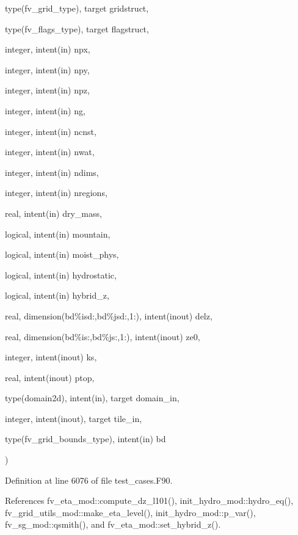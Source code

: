 {\begin{DoxyParamCaption}
\item[{type(fv\-\_\-grid\-\_\-type), target}]{gridstruct, }
\item[{type(fv\-\_\-flags\-\_\-type), target}]{flagstruct, }
\item[{integer, intent(in)}]{npx, }
\item[{integer, intent(in)}]{npy, }
\item[{integer, intent(in)}]{npz, }
\item[{integer, intent(in)}]{ng, }
\item[{integer, intent(in)}]{ncnst, }
\item[{integer, intent(in)}]{nwat, }
\item[{integer, intent(in)}]{ndims, }
\item[{integer, intent(in)}]{nregions, }
\item[{real, intent(in)}]{dry\-\_\-mass, }
\item[{logical, intent(in)}]{mountain, }
\item[{logical, intent(in)}]{moist\-\_\-phys, }
\item[{logical, intent(in)}]{hydrostatic, }
\item[{logical, intent(in)}]{hybrid\-\_\-z, }
\item[{real, dimension(bd\%isd\-:,bd\%jsd\-:,1\-:), intent(inout)}]{delz, }
\item[{real, dimension(bd\%is\-:,bd\%js\-:,1\-:), intent(inout)}]{ze0, }
\item[{integer, intent(inout)}]{ks, }
\item[{real, intent(inout)}]{ptop, }
\item[{type(domain2d), intent(in), target}]{domain\-\_\-in, }
\item[{integer, intent(inout), target}]{tile\-\_\-in, }
\item[{type(fv\-\_\-grid\-\_\-bounds\-\_\-type), intent(in)}]{bd}
\end{DoxyParamCaption}
)}\label{classtest__cases__mod_afe098f0f0a16a14e3e59312a69374b9e}


Definition at line 6076 of file test\-\_\-cases.\-F90.



References fv\-\_\-eta\-\_\-mod\-::compute\-\_\-dz\-\_\-l101(), init\-\_\-hydro\-\_\-mod\-::hydro\-\_\-eq(), fv\-\_\-grid\-\_\-utils\-\_\-mod\-::make\-\_\-eta\-\_\-level(), init\-\_\-hydro\-\_\-mod\-::p\-\_\-var(), fv\-\_\-sg\-\_\-mod\-::qsmith(), and fv\-\_\-eta\-\_\-mod\-::set\-\_\-hybrid\-\_\-z().




